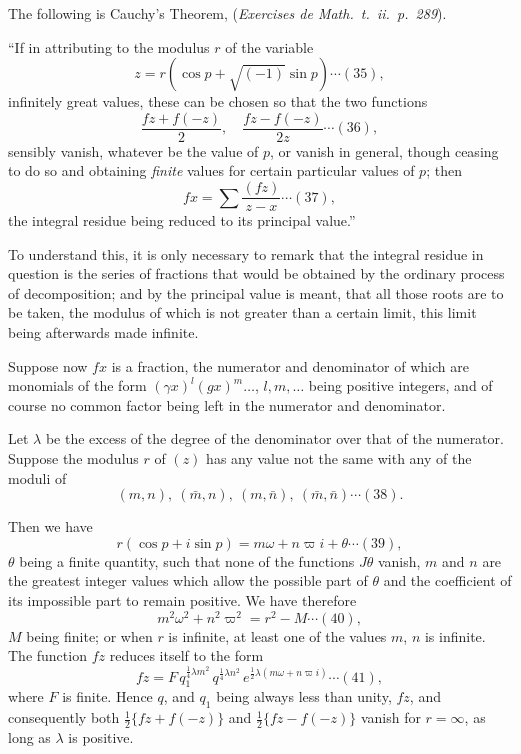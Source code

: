 \documentclass[12pt,a4paper]{article}
\newcommand{\mn}{(m,n)}
\newcommand{\mbn}{(\bar m,n)}
\newcommand{\mnb}{(m,\bar n)}
\newcommand{\mbnb}{(\bar m,\bar n)}
\begin{document}
The following is Cauchy's Theorem, (\textit{Exercises de Math.\ t.\ ii.\ p.~289}).

``If in attributing to the modulus $r$ of the variable
\[
z = r(\cos p + \sqrt{(-1)}\sin p) \cdots(35),
\]
infinitely great values, these can be chosen so that the two functions
\[
\frac{f z + f(-z)}{2},\quad \frac{f z - f(-z)}{2 z} \cdots(36),
\]
sensibly vanish, whatever be the value of $p$, or vanish in general, though ceasing to do so and obtaining \textit{finite} values for certain particular values of $p$; then
\[
f x = \sum\frac{(f z)}{z - x} \cdots(37),
\]
the integral residue being reduced to its principal value.''

To understand this, it is only necessary to remark that the integral residue in question is the series of fractions that would be obtained by the ordinary process of decomposition; and by the principal value is meant, that all those roots are to be taken, the modulus of which is not greater than a certain limit, this limit being afterwards made infinite.

Suppose now $f x$ is a fraction, the numerator and denominator of which are monomials of the form $(\gamma x)^l (g x)^m \ldots$, $l, m, \ldots$ being positive integers, and of course no common factor being left in the numerator and denominator.

Let $\lambda$ be the excess of the degree of the denominator over that of the numerator. Suppose the modulus $r$ of $(z)$ has any value not the same with any of the moduli of
\[
\mn,\ \mbn,\ \mnb,\ \mbnb \cdots(38).
\]

\newpage
\setcounter{page}{149}

Then we have
\[
r(\cos p + i\sin p) = m\omega + n\varpi i + \theta \cdots(39),
\]
$\theta$ being a finite quantity, such that none of the functions $J\theta$ vanish, $m$ and $n$ are the greatest integer values which allow the possible part of $\theta$ and the coefficient of its impossible part to remain positive. We have therefore
\[
m^2\omega^2 + n^2\varpi^2 = r^2 - M \cdots(40),
\]
$M$ being finite; or when $r$ is infinite, at least one of the values $m$, $n$ is infinite. The function $f z$ reduces itself to the form
\[
f z = F\,q_1^{\frac{1}{4}\lambda m^2}\,q^{\frac{1}{4}\lambda n^2}\,e^{\frac{1}{2}\lambda(m\omega + n\varpi i)} \cdots(41),
\]
where $F$ is finite. Hence $q$, and $q_1$ being always less than unity, $f z$, and consequently both $\tfrac{1}{2}\{f z + f(-z)\}$ and $\tfrac{1}{2}\{f z - f(-z)\}$ vanish for $r = \infty$, as long as $\lambda$ is positive.
\end{document}
